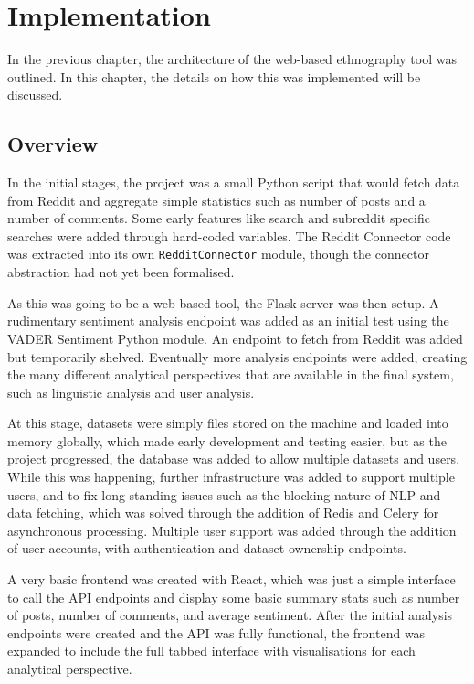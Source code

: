 \documentclass[12pt, a4paper]{article}
\begin{document}
\newpage
\section{Implementation}
In the previous chapter, the architecture of the web-based ethnography tool was
outlined. In this chapter, the details on how this was implemented will be
discussed.

\subsection{Overview}
In the initial stages, the project was a small Python script that would fetch data from Reddit and aggregate simple statistics such as number of posts and a number of comments. Some early features like search and subreddit specific searches were added through hard-coded variables. The Reddit Connector code was extracted into its own \texttt{RedditConnector} module, though the connector abstraction had not yet been formalised.

As this was going to be a web-based tool, the Flask server was then setup. A rudimentary sentiment analysis endpoint was added as an initial test using the VADER Sentiment Python module. An endpoint to fetch from Reddit was added but temporarily shelved. Eventually more analysis endpoints were added, creating the many different analytical perspectives that are available in the final system, such as linguistic analysis and user analysis. 

At this stage, datasets were simply files stored on the machine and loaded into memory globally, which made early development and testing easier, but as the project progressed, the database was added to allow multiple datasets and users. While this was happening, further infrastructure was added to support multiple users, and to fix long-standing issues such as the blocking nature of NLP and data fetching, which was solved through the addition of Redis and Celery for asynchronous processing. Multiple user support was added through the addition of user accounts, with authentication and dataset ownership endpoints.

A very basic frontend was created with React, which was just a simple interface to call the API endpoints and display some basic summary stats such as number of posts, number of comments, and average sentiment. After the initial analysis endpoints were created and the API was fully functional, the frontend was expanded to include the full tabbed interface with visualisations for each analytical perspective.
\end{document}
